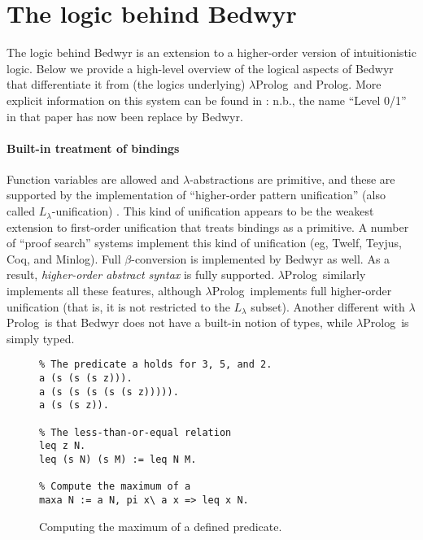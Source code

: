 \documentclass{article}
\newcommand{\lp}{$\lambda$Prolog}
\begin{document}
\section{The logic behind Bedwyr}
\label{logic}

The logic behind Bedwyr is an extension to a higher-order version of
intuitionistic logic.  Below we provide a high-level overview of the
logical aspects of Bedwyr that differentiate it from (the logics
underlying) \lp\ and Prolog.  More explicit information on this system
can be found in \cite{tiu05eshol}: n.b., the name ``Level 0/1'' in
that paper has now been replace by Bedwyr.


\paragraph{Built-in treatment of bindings}
Function variables are allowed and $\lambda$-abstractions are
primitive, and these are supported by the implementation of
``higher-order pattern unification'' (also called
$L_\lambda$-unification) \cite{miller91jlc}.  This kind of unification
appears to be the weakest extension to first-order unification that
treats bindings as a primitive.  A number of ``proof search'' systems
implement this kind of unification (eg, Twelf, Teyjus, Coq, and
Minlog).  Full $\beta$-conversion is implemented by Bedwyr as well.
As a result, {\em higher-order abstract syntax} is fully supported.
\lp\ similarly implements all these features, although \lp\ implements
full higher-order unification (that is, it is not restricted to the
$L_\lambda$ subset).  Another different with \lp\ is that Bedwyr does
not have a built-in notion of types, while \lp\ is simply typed.

\begin{figure}
\begin{verbatim}
% The predicate a holds for 3, 5, and 2.
a (s (s (s z))).
a (s (s (s (s (s z))))).
a (s (s z)).

% The less-than-or-equal relation
leq z N.
leq (s N) (s M) := leq N M.

% Compute the maximum of a
maxa N := a N, pi x\ a x => leq x N.
\end{verbatim}
\caption{Computing the maximum of a defined predicate.}
\label{maxa}
\end{figure}
\end{document}
